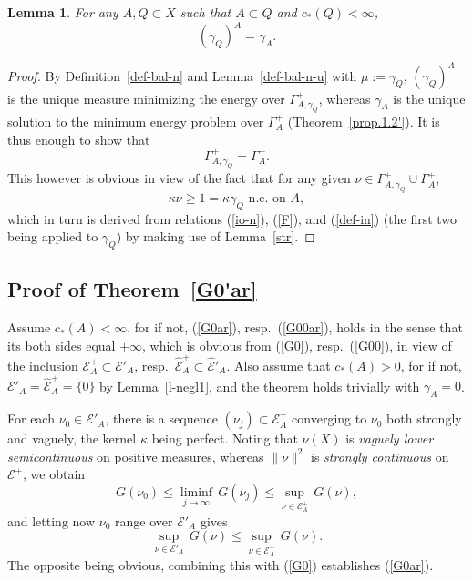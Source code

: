 \documentclass[12pt,a4paper,reqno]{amsart} %
\theoremstyle{lause}
\theoremstyle{maaritelma}
\theoremstyle{lause}
\newtheorem{lemma}[theorem]{Lemma}
\theoremstyle{maaritelma}
\numberwithin{equation}{section}
\begin{document}
\begin{lemma}\label{prop.1.1}For any\/ $A,Q\subset X$ such that\/ $A\subset Q$ and\/ $c_*(Q)<\infty$,
\begin{equation}\label{eq.1.1}(\gamma_Q)^A=\gamma_A.\end{equation}
\end{lemma}

\begin{proof}By Definition~\ref{def-bal-n} and Lemma~\ref{def-bal-n-u} with $\mu:=\gamma_Q$, $(\gamma_Q)^A$ is the unique measure minimizing the energy over $\Gamma_{A,\gamma_Q}^+$, whereas $\gamma_A$ is the unique solution to the minimum energy problem over $\Gamma_A^+$ (Theorem~\ref{prop.1.2'}). It is thus enough to show that
\begin{equation}\label{GG}\Gamma_{A,\gamma_Q}^+=\Gamma_A^+.\end{equation}
This however is obvious in view of the fact that for any given $\nu\in\Gamma_{A,\gamma_Q}^+\cup\Gamma_A^+$,
\[\kappa\nu\geqslant1=\kappa\gamma_Q\text{ \ n.e.\ on $A$},\]
which in turn is derived from relations (\ref{io-n}), (\ref{F}), and (\ref{def-in}) (the first two being applied to $\gamma_Q$) by making use of Lemma~\ref{str}.
\end{proof}

\subsection{Proof of Theorem~\ref{G0'ar}}\label{ch-pr3}
Assume $c_*(A)<\infty$, for if not, (\ref{G0ar}), resp.\ (\ref{G00ar}), holds in the sense that its both sides equal $+\infty$, which is obvious from (\ref{G0}), resp.\ (\ref{G00}), in view of the inclusion $\mathcal E^+_A\subset\mathcal E'_A$, resp.\ $\widehat{\mathcal E}^+_A\subset\widehat{\mathcal E}'_A$.
Also assume that $c_*(A)>0$, for if not, $\mathcal E'_A=\widehat{\mathcal E}^+_A=\{0\}$ by Lemma~\ref{l-negl1}, and the theorem holds trivially with $\gamma_A=0$.

For each $\nu_0\in\mathcal E'_A$, there is a sequence $(\nu_j)\subset\mathcal E^+_A$ converging to $\nu_0$ both strongly and vaguely, the kernel $\kappa$ being perfect. Noting that $\nu(X)$ is {\it vaguely lower semicontinuous\/} on positive measures, whereas $\|\nu\|^2$ is {\it strongly continuous\/} on $\mathcal E^+$, we obtain
\[G(\nu_0)\leqslant\liminf_{j\to\infty}\,G(\nu_j)\leqslant\sup_{\nu\in\mathcal E^+_A}\,G(\nu),\]
and letting now $\nu_0$ range over $\mathcal E'_A$ gives
\[\sup_{\nu\in\mathcal E'_A}\,G(\nu)\leqslant\sup_{\nu\in\mathcal E^+_A}\,G(\nu).\]
The opposite being obvious, combining this with (\ref{G0}) establishes (\ref{G0ar}).
\end{document}
